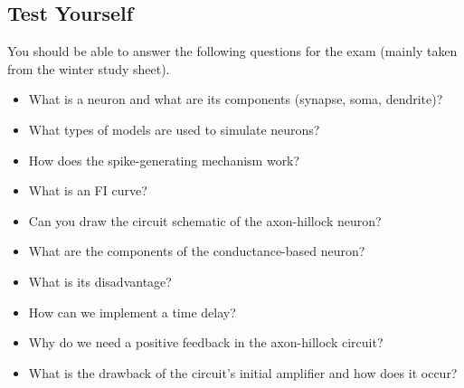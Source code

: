 \subsection{Test Yourself}

You should be able to answer the following questions for the exam (mainly taken from the winter study sheet).

\begin{itemize}
    \item What is a neuron and what are its components (synapse, soma, dendrite)?
    \item What types of models are used to simulate neurons?
    \item How does the spike-generating mechanism work?
    \item What is an FI curve?
    \item Can you draw the circuit schematic of the axon-hillock neuron?
    \item What are the components of the conductance-based neuron?
    \item What is its disadvantage?
    \item How can we implement a time delay?
    \item Why do we need a positive feedback in the axon-hillock circuit?
    \item What is the drawback of the circuit's initial amplifier and how does it occur?
\end{itemize}

   